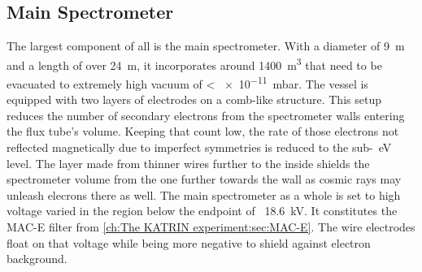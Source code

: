       \subsection{Main Spectrometer}
      \label{ch:The KATRIN experiment:sec:Experimental setup:subsec:MainSpec}
      The largest component of all is the main spectrometer. With a diameter of \SI{9}{\meter} and a length of over \SI{24}{\meter}, it incorporates around \SI{1400}{\cubic\meter} that need to be evacuated to extremely high vacuum of < \SI{e-11}{\milli\bar}. The vessel is equipped with two layers of electrodes on a comb-like structure. This setup reduces the number of secondary electrons from the spectrometer walls entering the flux tube's volume. Keeping that count low, the rate of those electrons not reflected magnetically due to imperfect symmetries is reduced to the sub-\SI{}{\electronvolt} level. The layer made from thinner wires further to the inside shields the spectrometer volume from the one further towards the wall as cosmic rays may unleash elecrons there as well.
      The main spectrometer as a whole is set to high voltage varied in the region below the endpoint of ~\SI{18.6}{\kilo\volt}. It constitutes the MAC-E filter from \ref{ch:The KATRIN experiment:sec:MAC-E}. The wire electrodes float on that voltage while being more negative to shield against electron background.

